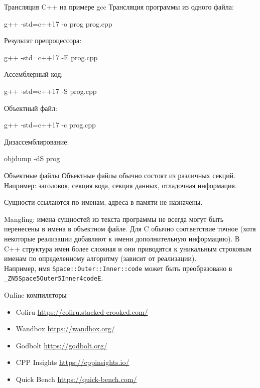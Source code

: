 \documentclass[unknownkeysallowed,xcolor=table]{beamer}
\begin{document}
\begin{frame}[fragile]{Трансляция C++ на примере gcc}
  Трансляция программы из одного файла:
  \begin{cmdlinelarge}
    g++ -std=c++17 -o prog prog.cpp
  \end{cmdlinelarge}
  Результат препроцессора:
  \begin{cmdlinelarge}
    g++ -std=c++17 -E prog.cpp
  \end{cmdlinelarge}
  Ассемблерный код:
  \begin{cmdlinelarge}
    g++ -std=c++17 -S prog.cpp
  \end{cmdlinelarge}
  Объектный файл:
  \begin{cmdlinelarge}
    g++ -std=c++17 -c prog.cpp
  \end{cmdlinelarge}
  Дизассемблирование:
  \begin{cmdlinelarge}
    objdump -dS prog
  \end{cmdlinelarge}
\end{frame}

\begin{frame}{Объектные файлы}
  Объектные файлы обычно состоят из различных секций. Например: заголовок, секция кода, секция данных, отладочная информация.

  Сущности ссылаются по именам, адреса в памяти не назначены.

  Mangling: имена сущностей из текста программы не всегда могут быть перенесены в имена в объектном файле. Для C обычно соответствие точное (хотя некоторые реализации добавляют к имени дополнительную информацию). В C++ структура имен более сложная и они приводятся к уникальным строковым именам по определенному алгоритму (зависит от реализации).\\
  Например, имя \lstinline{Space::Outer::Inner::code} может быть преобразовано в \lstinline{_ZN5Space5Outer5Inner4codeE}.
\end{frame}

\begin{frame}{Online компиляторы}
  \begin{itemize}
    \item Coliru  \href{https://coliru.stacked-crooked.com/}{https://coliru.stacked-crooked.com/} \vspace{2em}
    \item Wandbox  \href{https://wandbox.org/}{https://wandbox.org/} \vspace{2em}
    \item Godbolt  \href{https://godbolt.org/}{https://godbolt.org/} \vspace{2em}
    \item CPP Insights \href{https://cppinsights.io/}{https://cppinsights.io/} \vspace{2em}
    \item Quick Bench \href{https://quick-bench.com/}{https://quick-bench.com/}
  \end{itemize}
\end{frame}
\end{document}
